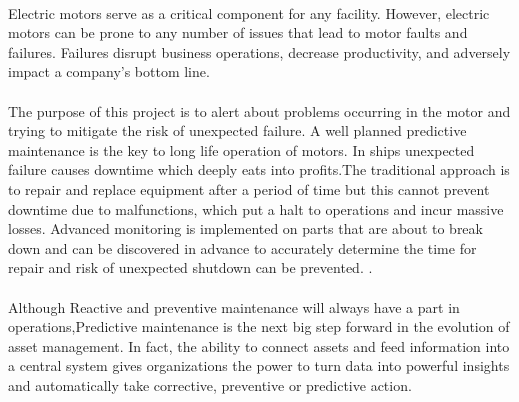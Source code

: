 \paragraph{}Electric motors serve as a critical component for any facility. However, electric motors can be prone to any number of issues that lead to motor faults and failures. Failures disrupt business operations, decrease productivity, and adversely impact a company’s bottom line.

\paragraph{}The purpose of this project is to alert about problems occurring in the motor and trying to mitigate the risk of unexpected failure. A well planned predictive maintenance is the key to long life operation of motors. In ships unexpected failure causes downtime which deeply eats into profits.The traditional approach is to repair and replace equipment after a period of time but this cannot prevent downtime due to malfunctions, which put a halt to operations and incur massive losses. Advanced monitoring is implemented on parts that are about to break down and can be discovered in advance to accurately determine the time for repair and risk of unexpected shutdown can be prevented.
 \cite{stefanopoulou_mechatronics_nodate}\cite{gonzatti_proposal_2017}\cite{thanapalan_model_nodate}.
\paragraph{}  Although Reactive and preventive maintenance will always have a part in operations,Predictive maintenance is the next big step forward in the evolution of asset management. In fact, the ability to connect assets and feed information into a central system gives organizations the power to turn data into powerful insights and automatically take corrective, preventive or predictive action.